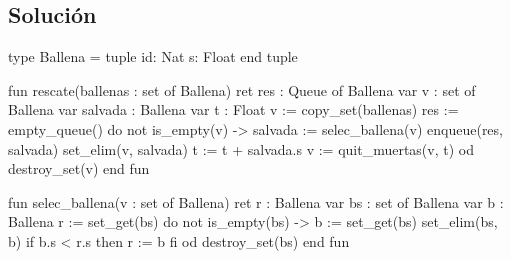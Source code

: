 \documentclass{article}
\begin{document}
\subsection*{Solución}
\begin{codebox}
\begin{pascallike}
type Ballena = tuple 
                id: Nat
                s: Float
              end tuple

fun rescate(ballenas : set of Ballena) ret res : Queue of Ballena
  var v : set of Ballena
  var salvada : Ballena
  var t : Float
  v := copy_set(ballenas)
  res := empty_queue()
  do not is_empty(v) ->
    salvada := selec_ballena(v)
    enqueue(res, salvada)
    set_elim(v, salvada)
    t := t + salvada.s
    v := quit_muertas(v, t)
  od
  destroy_set(v)
end fun 

fun selec_ballena(v : set of Ballena) ret r : Ballena
  var bs : set of Ballena
  var b : Ballena
  r := set_get(bs)
  do not is_empty(bs) ->
    b := set_get(bs)
    set_elim(bs, b)
    if b.s < r.s then
      r := b
    fi
  od
  destroy_set(bs)
end fun

\end{pascallike}
\end{codebox}
\end{document}
